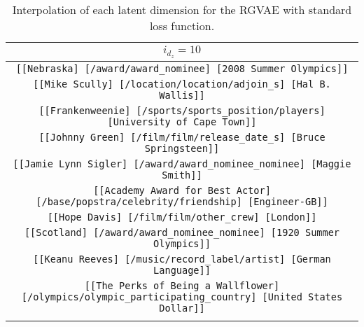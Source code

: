 \begin{longtable}{|c|}
    \hline
    \rowcolor[HTML]{EFEFEF} 
    \textsc{$i_{d_z}=10$}\\ \hline
    \texttt{[[Nebraska] [/award/award\_nominee] [2008 Summer Olympics]]}\\
    \texttt{[[Mike Scully] [/location/location/adjoin\_s] [Hal B. Wallis]]}\\
    \texttt{[[Frankenweenie] [/sports/sports\_position/players] [University of Cape Town]]}\\
    \texttt{[[Johnny Green] [/film/film/release\_date\_s] [Bruce Springsteen]]}\\
    \texttt{[[Jamie Lynn Sigler] [/award/award\_nominee\_nominee] [Maggie Smith]]}\\
    \texttt{[[Academy Award for Best Actor] [/base/popstra/celebrity/friendship] [Engineer-GB]]}\\
    \texttt{[[Hope Davis] [/film/film/other\_crew] [London]]}\\
    \texttt{[[Scotland] [/award/award\_nominee\_nominee] [1920 Summer Olympics]]}\\
    \texttt{[[Keanu Reeves] [/music/record\_label/artist] [German Language]]}\\
    \texttt{[[The Perks of Being a Wallflower] [/olympics/olympic\_participating\_country] [United States Dollar]]}\\
    \hline
\caption{Interpolation of each latent dimension for the RGVAE with standard loss function.}
\label{annexA:ipdim95NoPerm}
\end{longtable}


